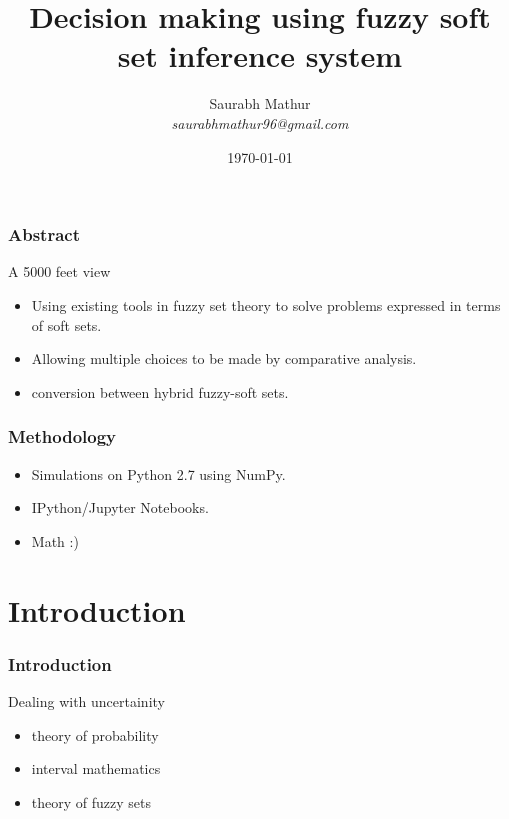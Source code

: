 \documentclass{beamer}
\title{Decision making using fuzzy soft set inference system}
\author{Saurabh Mathur\\ 
\emph{saurabhmathur96@gmail.com}}
\institute{ SITE, VIT Vellore }
\date{\today}
\begin{document}
  \begin{frame}
    \titlepage
  \end{frame}
  
  
    \begin{frame}
    \tableofcontents
    \end{frame}
    
    
    
  \begin{frame}
  \frametitle{Abstract}
   \begin{LARGE}
    A 5000 feet view
   \end{LARGE}
   \begin{itemize}

   \item Using existing tools in fuzzy set theory to solve problems expressed in terms of soft sets.
   \item  Allowing multiple choices to be made by comparative analysis.
	\item conversion between hybrid fuzzy-soft sets.
   \end{itemize}
  
  \end{frame}
  
  
  \begin{frame}
  \frametitle{Methodology}
    \begin{itemize}
  \item Simulations on Python 2.7 using NumPy.
  \item IPython/Jupyter Notebooks.
  \item Math :)
  \end{itemize}

  \end{frame}
  
  \section{Introduction}
  \frametitle{Introduction}
    \begin{frame}
    \begin{LARGE}
    Dealing with uncertainity
    \end{LARGE}
    \begin{itemize}
        \item theory of probability
    \item interval mathematics
        \item theory of fuzzy sets
    \end{itemize}
    \end{frame}
    
\end{document}
